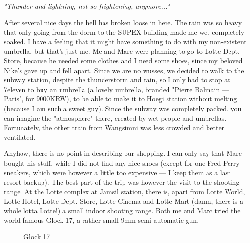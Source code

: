 \begin{post}
	\begin{content}
\textit{"Thunder and lightning, not so frightening, anymore..."}

After several nice days the hell has broken loose in here. The rain was so heavy that only going from the dorm to the SUPEX building made me \sout{wet} completely soaked. I have a feeling that it might have something to do with my non-existent umbrella, but that's just me. Me and Marc were planning to go to Lotte Dept. Store, because he needed some clothes and I need some shoes, since my beloved Nike's gave up and fell apart. Since we are no wusses, we decided to walk to the subway station, despite the thunderstorm and rain, so I only had to stop at 7eleven to buy an umbrella (a lovely umbrella, branded "Pierre Balmain — Paris", for 9000KRW), to be able to make it to Hoegi station without melting (because I am such a sweet guy). Since the subway was completely packed, you can imagine the "atmosphere" there, created by wet people and umbrellas. Fortunately, the other train from Wangsimni was less crowded and better ventilated.

Anyhow, there is no point in describing our shopping. I can only say that Marc bought his stuff, while I did not find any nice shoes (except for one Fred Perry sneakers, which were however a little too expensive — I keep them as a last resort backup). The best part of the trip was however the visit to the shooting range. At the Lotte complex at Jamsil station, there is, apart from Lotte World, Lotte Hotel, Lotte Dept. Store, Lotte Cinema and Lotte Mart (damn, there is a whole lotta Lotte!) a small indoor shooting range. Both me and Marc tried the world famous Glock 17, a rather small 9mm semi-automatic gun.

\begin{figure}[h]
\centering
{}
\caption{Glock 17}
\end{figure}


\end{content}
\end{post}
